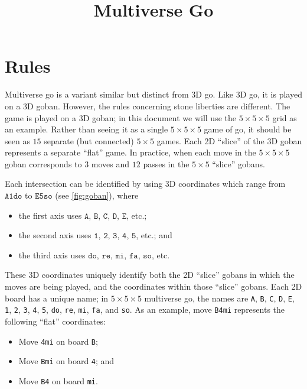 \documentclass[twocolumn]{article}
\title{Multiverse Go}
\date{}
\begin{document}
\maketitle

\pagestyle{empty}

\section{Rules}

Multiverse go is a variant similar but distinct from 3D go.  Like 3D go, it is
played on a 3D goban.  However, the rules concerning stone liberties are
different.
%
The game is played on a 3D goban;  in this document we will use the $5\times
5\times 5$ grid as an example.  Rather than seeing it as a single $5 \times
5\times 5$ game of go, it should be seen as $15$ separate (but connected)
$5\times 5$ games.  Each 2D ``slice'' of the 3D goban represents a separate
``flat'' game.  In practice, when each move in the $5\times 5\times 5$ goban
corresponds to $3$ moves and $12$ passes in the $5\times 5$ ``slice'' gobans.

Each intersection can be identified by using 3D coordinates which range from
$\texttt{A1do}$ to $\texttt{E5so}$ (see \cref{fig:goban}), where
%
\begin{itemize}
  \item the first axis uses $\texttt{A}$, $\texttt{B}$, $\texttt{C}$,
    $\texttt{D}$, $\texttt{E}$, etc.;
  \item the second axis uses $\texttt{1}$, $\texttt{2}$, $\texttt{3}$,
    $\texttt{4}$, $\texttt{5}$, etc.; and
  \item the third axis uses $\texttt{do}$, $\texttt{re}$, $\texttt{mi}$,
    $\texttt{fa}$, $\texttt{so}$, etc.
\end{itemize}


These 3D coordinates uniquely identify both the 2D ``slice'' gobans in which
the moves are being played, and the coordinates within those ``slice'' gobans.
%
Each 2D board has a unique name;  in $5\times 5\times 5$ multiverse go, the
names are 
%
\texttt{A}, \texttt{B}, \texttt{C}, \texttt{D}, \texttt{E},
%
\texttt{1}, \texttt{2}, \texttt{3}, \texttt{4}, \texttt{5},
%
\texttt{do}, \texttt{re}, \texttt{mi}, \texttt{fa}, and \texttt{so}.
%
As an example, move \texttt{B4mi} represents the following ``flat'' coordinates:
%
\begin{itemize}
  \item Move \texttt{4mi} on board \texttt{B};
  \item Move \texttt{Bmi} on board \texttt{4}; and
  \item Move \texttt{B4} on board \texttt{mi}.
\end{itemize}
\end{document}
